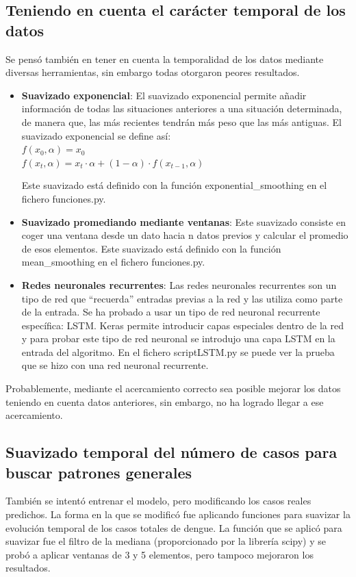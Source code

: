 \documentclass[acmtog, screen]{acmart}
\begin{document}
\subsection{Teniendo en cuenta el carácter temporal de los datos}
Se pensó también en tener en cuenta la temporalidad de los datos mediante diversas herramientas, sin embargo todas otorgaron peores resultados.
\begin{itemize}
	\item \textbf{Suavizado exponencial}: El suavizado exponencial permite añadir información de todas las situaciones anteriores a una situación determinada, de manera que, las más recientes tendrán más peso que las más antiguas. El suavizado exponencial se define así: \\
	$f(x_0,\alpha)=x_0$\\
	$f(x_t,\alpha)=x_t \cdot \alpha+(1-\alpha)\cdot f(x_{t-1},\alpha)$
	
	Este suavizado está definido con la función exponential\_smoothing en el fichero funciones.py.
	
	\item \textbf{Suavizado promediando mediante ventanas}: Este suavizado consiste en coger una ventana desde un dato hacia n datos previos y calcular el promedio de esos elementos. Este suavizado está definido con la función mean\_smoothing en el fichero funciones.py.
	
	\item \textbf{Redes neuronales recurrentes}: Las redes neuronales recurrentes son un tipo de red que ``recuerda'' entradas previas a la red y las utiliza como parte de la entrada. Se ha probado a usar un tipo de red neuronal recurrente específica: LSTM. Keras permite introducir capas especiales dentro de la red y para probar este tipo de red neuronal se introdujo una capa LSTM en la entrada del algoritmo. En el fichero scriptLSTM.py se puede ver la prueba que se hizo con una red neuronal recurrente.
\end{itemize}
Probablemente, mediante el acercamiento correcto sea posible mejorar los datos teniendo en cuenta datos anteriores, sin embargo, no ha logrado llegar a ese acercamiento.

\subsection{Suavizado temporal del número de casos para buscar patrones generales}
También se intentó entrenar el modelo, pero modificando los casos reales predichos. La forma en la que se modificó fue aplicando funciones para suavizar la evolución temporal de los casos totales de dengue. La función que se aplicó para suavizar fue el filtro de la mediana (proporcionado por la librería scipy) y se probó a aplicar ventanas de 3 y 5 elementos, pero tampoco mejoraron los resultados. 
\end{document}
